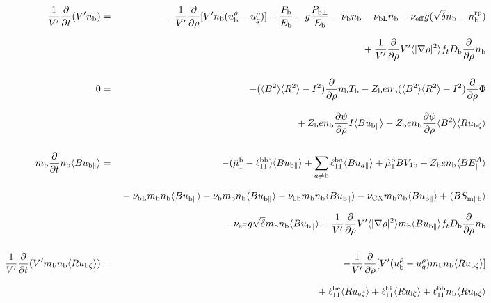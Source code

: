 \documentclass[11pt]{article}
\def\r#1{{\rm#1}}
\def\aves#1{\langle#1\rangle}
\def\dd#1#2{\frac{\partial #1}{\partial #2}}
\def\para{\parallel}
\def\ddrho{\frac{\partial}{\partial\rho}}
\def\ddV{\frac{\partial}{\partial V}}
\def\mb{m_\r{b}}
\def\ni{n_\r{i}}
\def\nb{n_\r{b}}
\def\Tb{T_\r{b}}
\def\Zb{Z_\r{b}}
\def\Pb{P_\r{b}}
\def\Eb{E_\r{b}}
\def\uezt{u_{\r{e}\zeta}}
\def\uizt{u_{\r{i}\zeta}}
\def\ubzt{u_{\r{b}\zeta}}
\def\ubpara{u_{\r{b}\para}}
\def\qhatepara{\hat{q}_{\r{e}\para}}
\def\qhatipara{\hat{q}_{\r{i}\para}}
\def\ubrho{u_\r{b}^\rho}
\def\ugrho{u_{g}^\rho}
\def\bri{\aves{B^2}\aves{R^2} - I^2}
\def\ddt{\frac{\partial}{\partial t}}
\def\nbrp{n_\r{b}^\r{rp}}
\def\Pbpara{P_{\r{b}\parallel}}
\def\Pbperp{P_{\r{b}\perp}}
\def\nueff{\nu_\r{eff}}
\def\Db{D_\r{b}}
\def\nunb{\nu_\r{0b}}
\def\nuCX{\nu_\r{CX}}
\def\nub{\nu_\r{b}}
\def\nubL{\nu_\r{bL}}
\def\red#1{\textcolor{red}{#1}}
\begin{document}
%
\begin{eqnarray}
  \frac{1}{V'} \ddt (V' \nb) &=&
%
  - \frac{1}{V'} \ddrho [ V' \nb (\ubrho - \ugrho) ]
%
  + \frac{\Pb}{\Eb}
%
  - g \frac{\Pbperp}{\Eb}
%
  - \nub \nb
%
  - \nubL \nb
%
  - \nueff g (\sqrt{\delta} \nb - \nbrp)
%
\nonumber\\[2.5mm]&&{}
  + \frac{1}{V'} \ddrho V'\aves{|\nabla\rho|^2} f_t \Db \ddrho \nb
%
\\[5mm]
  0 &=&
%
  -           ( \bri ) \ddrho \nb \Tb
%
  - \Zb e \nb ( \bri ) \ddrho \Phi
\nonumber\\[3mm]&&{}
%
  + \Zb e \nb \dd{\psi}{\rho} I          \aves{B\ubpara}
%
  - \Zb e \nb \dd{\psi}{\rho} \aves{B^2} \aves{R\ubzt}
\\[5mm]
  \mb \ddt \nb \aves{B \ubpara} &=&
%
  - (\hat{\mu}_1^\r{b} - \ell_{11}^\r{bb}) \aves{B \ubpara}
%
  + \sum_{a\neq\r{b}} \ell_{11}^{\r{b}a} \aves{B u_{a\para}}
%
  + \hat{\mu}_1^\r{b} {B V_{1\r{b}}}
%
  + \Zb e \nb \aves{B E_\para^A}
\nonumber\\[2.5mm]&&{}
%
  - \nubL \mb \nb \aves{B\ubpara}
%
  - \nub  \mb \nb \aves{B\ubpara}
%
  - \nunb \mb \nb \aves{B\ubpara}
%
  - \nuCX \mb \nb \aves{B\ubpara}
%
  + \aves{B S_{\r{m}\para\r{b}}}
%
%
\nonumber\\[2.5mm]&&{}
  - \nueff g \sqrt{\delta} \mb \nb \aves{B\ubpara}
%
  + \frac{1}{V'} \ddrho V' \aves{|\nabla\rho|^2} \mb \aves{B\ubpara} f_t \Db \ddrho \nb
\\[5mm]
  \frac{1}{V'} \ddt (V' \mb \nb \aves{R \ubzt}) &=&
%
  - \frac{1}{V'} \dd{}{\rho}[ V' (\ubrho - \ugrho) \mb \nb \aves{R \ubzt} ]
%
\nonumber\\[2.5mm]&&{}
%
  + \ell_{11}^\r{be} \aves{R \uezt}
  + \ell_{11}^\r{bi} \aves{R \uizt}
  + \ell_{11}^\r{bb} \nb \aves{R \ubzt}
\nonumber\\[2.5mm]&&{}
%

\end{eqnarray}
\end{document}
